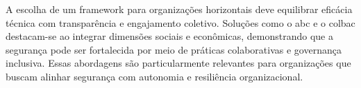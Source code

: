 A escolha de um framework para organizações horizontais deve
equilibrar eficácia técnica com transparência e engajamento coletivo.
Soluções como o \gls{abc} e o  \gls{colbac} destacam-se ao integrar dimensões
sociais e econômicas, demonstrando que a segurança pode ser
fortalecida por meio de práticas colaborativas e governança inclusiva.
Essas abordagens são particularmente relevantes para organizações que
buscam alinhar segurança com autonomia e resiliência organizacional.
